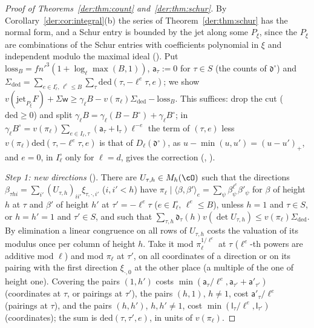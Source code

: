 \begin{proof}[Proof of Theorems~\ref{der:thm:count} and~\ref{der:thm:schur}]
By Corollary~\ref{der:cor:integral}(b) the series of Theorem~\ref{der:thm:schur} has the normal form,
and a Schur entry is bounded by the jet along some $P_\xi$, since the $P_\xi$ are combinations of the
Schur entries with coefficients polynomial in $\xi$ and independent modulo the maximal ideal
(). Put
$\mathrm{loss}_B=fn'^3(1+\log_\ell\max(B,1))$, $\mathsf a_\tau:=0$ for $\tau\in S$ (the counts of
$\mathfrak d^\circ$) and
$\Sigma_{\mathrm{ded}}=\sum_{e\in I_\ell^\circ,\,\ell^e\le B}\sum_\tau\mathrm{ded}(\tau,-\ell^e\tau,e)$;
we show $v(\mathrm{jet}_{P_\xi}F)+\Sigma\mathsf w\ge\gamma_\ell B-v(\pi_\ell)\Sigma_{\mathrm{ded}}-\mathrm{loss}_B$.
This suffices: drop the cut ($\mathrm{ded}\ge0$) and split
$\gamma_\ell B=\gamma_\ell(B-B^\circ)+\gamma_\ell B^\circ$; in
$\gamma_\ell B^\circ=v(\pi_\ell)\sum_{e\in I_\ell,\tau}(\mathsf a_\tau+\mathsf l_\tau)\ell^{-e}$ the term
of $(\tau,e)$ less $v(\pi_\ell)\mathrm{ded}(\tau,-\ell^e\tau,e)$ is that of $D_\ell(\mathfrak d^\circ)$,
as $u-\min(u,u')=(u-u')_+$, and $e=0$, in $I_\ell^\circ$ only for $\ell=d$, gives the correction
(, ).

\emph{Step 1: new directions} (). There are $U_{\tau,h}\in M_h(\cO)$
such that the directions $\beta_{\tau hi}=\sum_{i'}(U_{\tau,h})_{ii'}\xi_{\tau,\cdot,i'}$ ($i,i'<h$)
have $\pi_\ell\mid\langle\beta,\beta'\rangle_e=\sum_\psi\beta_\psi^{\ell^e}\beta'_\psi$ for $\beta$ of
height $h$ at $\tau$ and $\beta'$ of height $h'$ at $\tau'=-\ell^e\tau$ ($e\in I_\ell^\circ$,
$\ell^e\le B$), unless $h=1$ and $\tau\in S$, or $h=h'=1$ and $\tau'\in S$, and such that
$\sum_{\tau,h}\mathfrak d_\tau(h)v(\det U_{\tau,h})\le v(\pi_\ell)\Sigma_{\mathrm{ded}}$.
By elimination a linear congruence on all rows of $U_{\tau,h}$ costs the valuation of its modulus once
per column of height $h$. Take it mod $\pi_\ell^{1/\ell^e}$ at $\tau$ ($\ell^e$-th powers are additive
mod $\ell$) and mod $\pi_\ell$ at $\tau'$, on all coordinates of a direction or on its pairing with
the first direction $\xi_{\cdot,0}$ at the other place (a multiple of the one of height one). Covering
the pairs $(1,h')$ costs $\min(\mathsf a_\tau/\ell^e,\mathsf a_{\tau'}+\mathsf a'_{\tau'})$ (coordinates
at $\tau$, or pairings at $\tau'$), the pairs $(h,1)$, $h\ne1$, cost $\mathsf a'_\tau/\ell^e$ (pairings
at $\tau$), and the pairs $(h,h')$, $h,h'\ne1$, cost $\min(\mathsf l_\tau/\ell^e,\mathsf l_{\tau'})$
(coordinates); the sum is $\mathrm{ded}(\tau,\tau',e)$, in units of $v(\pi_\ell)$.


\end{proof}
